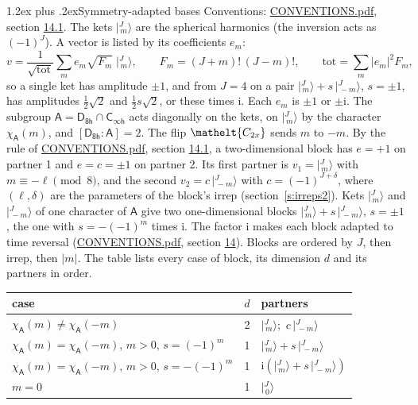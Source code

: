 \documentclass[10pt,a4paper]{article}
\makeatletter
\renewcommand\section{\@startsection{section}{1}{\z@}{-3ex plus -1ex minus -.2ex}%
  {1.2ex plus .2ex}{\normalfont\large\sffamily\bfseries\color{parttitle}}}
\numberwithin{equation}{section}
\newcommand{\eltfont}[1]{{\let\sigma\eltsigma\mathelt{#1}}}
\newcommand{\grp}[1]{\mathsf{#1}}
\newcommand{\elt}[1]{\eltfont{#1}}
\newcommand{\grpindex}[2]{[#1 : #2]}
\newcommand{\iunit}{\mathrm{i}}
\newcommand{\chiA}{\chi_{\grp{A}}}
\newcommand{\jm}[2]{\bigl\lvert{}^{#1}_{\,#2}\bigr\rangle}
\makeatother
\begin{document}
\section{Symmetry-adapted bases}\label{s:bases}
Conventions: \href{../../CONVENTIONS.pdf}{CONVENTIONS.pdf}, section \href{../../CONVENTIONS.pdf\#conv.14.1}{14.1}.
\leavevmode\label{n:index.m}\label{n:vector.ket}The kets $\jm{J}{m}$ are the spherical harmonics (the inversion acts as $(-1)^J$). \label{n:index.ketcoefficient}\label{n:vector.basis.symmetry}\label{n:index.ketweight}\label{n:index.total}A vector is listed by its coefficients $e_m$:
\begin{equation}\label{e:ket}v = \frac{1}{\sqrt{\mathrm{tot}}}\sum_m e_m\sqrt{F_m}\;\jm{J}{m},\qquad F_m = (J+m)!\,(J-m)!,\qquad \mathrm{tot} = \sum_m |e_m|^2F_m,\end{equation}
\leavevmode\label{n:index.pair.sign}so a single ket has amplitude $\pm1$, and from $J = 4$ on a pair $\jm{J}{m} + s\,\jm{J}{-m}$, $s = \pm1$, has amplitudes $\tfrac{1}{2}\sqrt{2}$ and $\tfrac{1}{2}s\sqrt{2}$, or these times $\iunit$. Each $e_m$ is $\pm1$ or $\pm\iunit$.
\leavevmode\label{n:group.A}\label{n:function.character.abelian}The subgroup $\grp{A} = \grp{D_{8h}}\cap\grp{C_{\infty h}}$ acts diagonally on the kets, on $\jm{J}{m}$ by the character $\chiA(m)$, and $\grpindex{\grp{D_{8h}}}{\grp{A}} = 2$. The flip $\elt{C_{2x}}$ sends $m$ to $-m$. \label{n:index.partner.sign}By the rule of \href{../../CONVENTIONS.pdf}{CONVENTIONS.pdf}, section \href{../../CONVENTIONS.pdf\#conv.14.1}{14.1}, a two-dimensional block has $e = +1$ on partner 1 and $e = c = \pm1$ on partner 2. Its first partner is $v_1 = \jm{J}{m}$ with $m \equiv -\ell \pmod{8}$, and the second $v_2 = c\,\jm{J}{-m}$ with $c = (-1)^{J+\delta}$, where $(\ell, \delta)$ are the parameters of the block's irrep (section~\ref{s:irreps2}). Kets $\jm{J}{m}$ and $\jm{J}{-m}$ of one character of $\grp{A}$ give two one-dimensional blocks $\jm{J}{m} + s\,\jm{J}{-m}$, $s = \pm1$, the one with $s = -(-1)^m$ times $\iunit$. The factor $\iunit$ makes each block adapted to time reversal (\href{../../CONVENTIONS.pdf}{CONVENTIONS.pdf}, section \href{../../CONVENTIONS.pdf\#conv.14}{14}). Blocks are ordered by $J$, then irrep, then $|m|$.
\leavevmode\label{n:head.case}\label{n:head.partners}The table lists every case of block, its dimension $d$ and its partners in order.
\begin{center}\begin{tabular}{@{}lrl@{}}\toprule
case & $d$ & partners\\\midrule
$\chiA(m) \ne \chiA(-m)$ & 2 & $\jm{J}{m}$;\ $c\,\jm{J}{-m}$\\
$\chiA(m) = \chiA(-m)$, $m > 0$, $s = (-1)^m$ & 1 & $\jm{J}{m} + s\,\jm{J}{-m}$\\
$\chiA(m) = \chiA(-m)$, $m > 0$, $s = -(-1)^m$ & 1 & $\iunit(\jm{J}{m} + s\,\jm{J}{-m})$\\
$m = 0$ & 1 & $\jm{J}{0}$\\
\bottomrule\end{tabular}\end{center}
\end{document}
